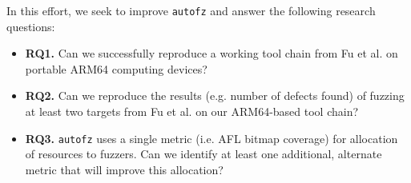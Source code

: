 In this effort, we seek to improve \texttt{autofz} and answer the following research questions:
\begin{itemize}
    \item \textbf{RQ1.} Can we successfully reproduce a working tool chain from
    Fu et al. \cite{fu_autofz_2023} on portable ARM64 computing devices?
    \item \textbf{RQ2.} Can we reproduce the results (e.g. number of defects found)
     of fuzzing at least two targets from Fu et al. \cite{fu_autofz_2023} on our ARM64-based
      tool chain?
    \item \textbf{RQ3.} \texttt{autofz} uses a single metric (i.e. AFL bitmap coverage) for
     allocation of resources to fuzzers. Can we identify at least one additional,
     alternate metric that will improve this allocation?
\end{itemize}
